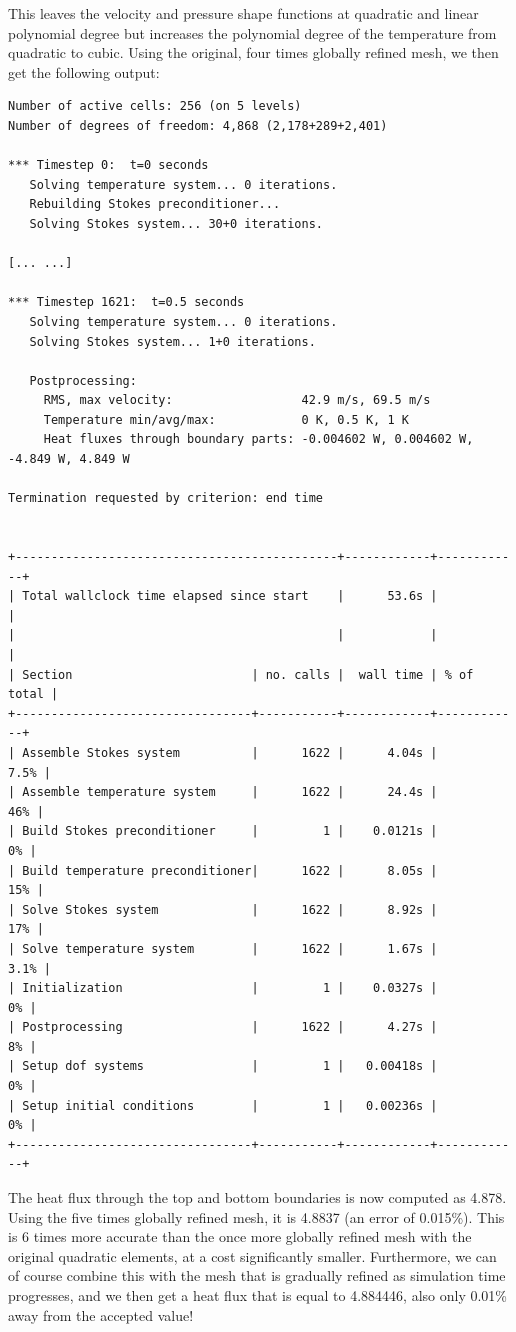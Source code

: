 \documentclass{article}
\begin{document}
This leaves the velocity and pressure shape functions at quadratic and linear
polynomial degree but increases the polynomial degree of the temperature from
quadratic to cubic. Using the original, four times globally refined mesh, we
then get the following output:
\begin{lstlisting}[frame=single,language=ksh]
Number of active cells: 256 (on 5 levels)
Number of degrees of freedom: 4,868 (2,178+289+2,401)

*** Timestep 0:  t=0 seconds
   Solving temperature system... 0 iterations.
   Rebuilding Stokes preconditioner...
   Solving Stokes system... 30+0 iterations.

[... ...]

*** Timestep 1621:  t=0.5 seconds
   Solving temperature system... 0 iterations.
   Solving Stokes system... 1+0 iterations.

   Postprocessing:
     RMS, max velocity:                  42.9 m/s, 69.5 m/s
     Temperature min/avg/max:            0 K, 0.5 K, 1 K
     Heat fluxes through boundary parts: -0.004602 W, 0.004602 W, -4.849 W, 4.849 W

Termination requested by criterion: end time


+---------------------------------------------+------------+------------+
| Total wallclock time elapsed since start    |      53.6s |            |
|                                             |            |            |
| Section                         | no. calls |  wall time | % of total |
+---------------------------------+-----------+------------+------------+
| Assemble Stokes system          |      1622 |      4.04s |       7.5% |
| Assemble temperature system     |      1622 |      24.4s |        46% |
| Build Stokes preconditioner     |         1 |    0.0121s |         0% |
| Build temperature preconditioner|      1622 |      8.05s |        15% |
| Solve Stokes system             |      1622 |      8.92s |        17% |
| Solve temperature system        |      1622 |      1.67s |       3.1% |
| Initialization                  |         1 |    0.0327s |         0% |
| Postprocessing                  |      1622 |      4.27s |         8% |
| Setup dof systems               |         1 |   0.00418s |         0% |
| Setup initial conditions        |         1 |   0.00236s |         0% |
+---------------------------------+-----------+------------+------------+

\end{lstlisting}

The heat flux through the top and bottom boundaries is now computed as 4.878.
Using the five times globally refined mesh, it is 4.8837 (an error of 0.015\%). 
This is 6 times more accurate than the 
once more globally refined mesh with the original quadratic elements, at a cost
significantly smaller. Furthermore, we can of course combine this with the mesh
that is gradually refined as simulation time progresses, and we then get a heat
flux that is equal to 4.884446, also only 0.01\% away from the accepted value!
\end{document}
